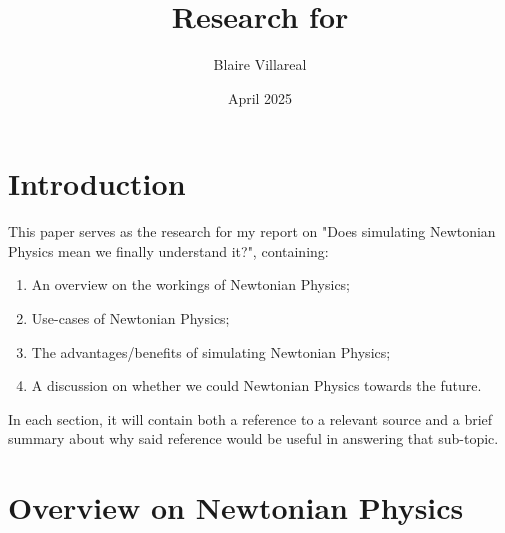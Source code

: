 \documentclass[12pt]{article}
\title{Research for \say{Does simulating Newtonian Physics mean we finally understand it?}}
\author{Blaire Villareal}
\date{April 2025}
\begin{document}
\maketitle

\raggedright %


\section*{Introduction}

This paper serves as the research for my report on "Does simulating Newtonian Physics mean we finally understand it?",
containing: 

\begin{enumerate}
    \item An overview on the workings of Newtonian Physics;
    \item Use-cases of Newtonian Physics;
    \item The advantages/benefits of simulating Newtonian Physics;
    \item A discussion on whether we could  Newtonian Physics towards the future.
\end{enumerate}

\par 

In each section, it will contain both a reference to a relevant source and
a brief summary about why said reference would be useful in answering that sub-topic.

\newpage


\section{Overview on Newtonian Physics}


\end{document}
